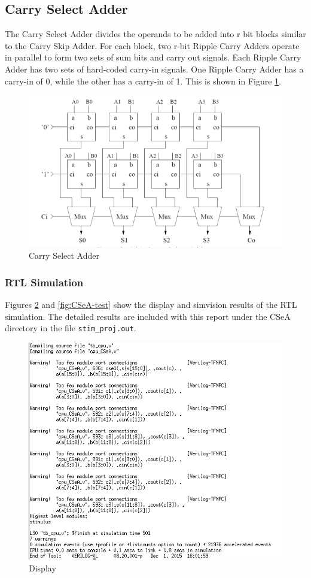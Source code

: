 \documentclass[12pt]{article}
\begin{document}
\subsection{Carry Select Adder}
The Carry Select Adder divides the operands to be added into r bit blocks similar to the Carry Skip Adder. For each block, two r-bit Ripple Carry Adders operate in parallel to form two sets of sum bits and carry out signals. Each Ripple Carry Adder has two sets of hard-coded carry-in signals. One Ripple Carry Adder has a carry-in of 0, while the other has a carry-in of 1. This is shown in Figure \ref{fig:carry-select}.

\begin{figure}[H]
\centering
\includegraphics[width=0.7\linewidth]{carry-select}
\caption{Carry Select Adder}
\label{fig:carry-select}
\end{figure}

\subsubsection{RTL Simulation}
Figures \ref{fig:CSeA-text} and \ref{fig:CSeA-test} show the display and simvision results of the RTL simulation. The detailed results are included with this report under the CSeA directory in the file \texttt{stim\_proj.out}.
\begin{figure}[H]
\centering
\includegraphics[width=.7\linewidth]{../CSeA/CSeA-text}
\caption{Display}
\label{fig:CSeA-text}
\end{figure}
\end{document}
